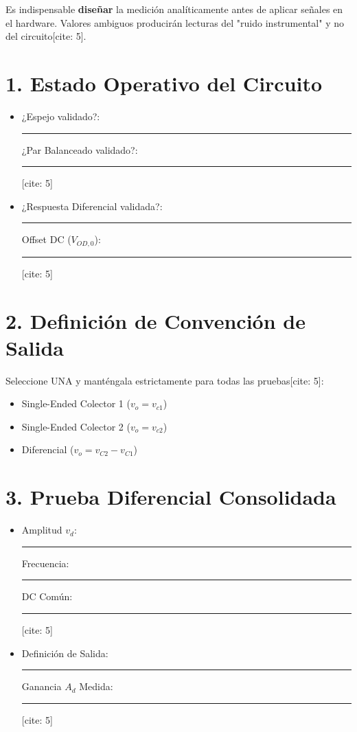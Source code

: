 \documentclass[11pt, a4paper]{article}
\begin{document}
\begin{tcolorbox}[colback=ucbblue!5, colframe=ucbblue, title=\textbf{Planificación de Medición: Modo Común y CMRR}]
    Es indispensable \textbf{diseñar} la medición analíticamente antes de aplicar señales en el hardware. Valores ambiguos producirán lecturas del "ruido instrumental" y no del circuito[cite: 5].
\end{tcolorbox}

\section*{1. Estado Operativo del Circuito}
\begin{itemize}
    \item ¿Espejo validado?: \rule{2.5cm}{0.15mm} \hfill ¿Par Balanceado validado?: \rule{2.5cm}{0.15mm}[cite: 5]
    \item ¿Respuesta Diferencial validada?: \rule{2.5cm}{0.15mm} \hfill Offset DC ($V_{OD,0}$): \rule{2.5cm}{0.15mm}[cite: 5]
\end{itemize}

\section*{2. Definición de Convención de Salida}
Seleccione UNA y manténgala estrictamente para todas las pruebas[cite: 5]:
\begin{itemize}
    \item[$\square$] Single-Ended Colector 1 ($v_o = v_{c1}$)
    \item[$\square$] Single-Ended Colector 2 ($v_o = v_{c2}$)
    \item[$\square$] Diferencial ($v_o = v_{C2} - v_{C1}$)
\end{itemize}

\section*{3. Prueba Diferencial Consolidada}
\begin{itemize}
    \item Amplitud $v_d$: \rule{2cm}{0.15mm} \hfill Frecuencia: \rule{2cm}{0.15mm} \hfill DC Común: \rule{2cm}{0.15mm}[cite: 5]
    \item Definición de Salida: \rule{4.5cm}{0.15mm} \hfill Ganancia $A_d$ Medida: \rule{2.5cm}{0.15mm}[cite: 5]
\end{itemize}
\end{document}

